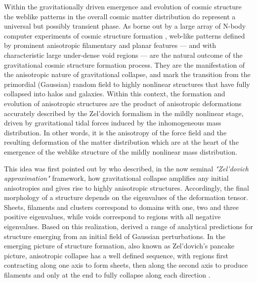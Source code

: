 Within the gravitationally driven emergence and evolution of cosmic structure the weblike patterns in the overall cosmic matter 
distribution do represent a universal but possibly transient phase. As borne out by a large array of N-body computer experiments 
of cosmic structure formation \citep[e.g.][]{Springel2005c, Vogelsberger2014,Schaye2015}, web-like patterns 
defined by prominent anisotropic filamentary and planar features --- and with characteristic large under-dense void regions --- are the 
natural outcome of the gravitational cosmic structure formation process. They are the manifestation of the anisotropic nature of gravitational 
collapse, and mark the transition from the primordial (Gaussian) random field to highly nonlinear structures that have fully collapsed into halos 
and galaxies. 
Within this context, the formation and evolution of anisotropic structures are the product of anisotropic deformations accurately described by the Zel'dovich formalism in the mildly nonlinear stage, driven by gravitational tidal forces induced by the inhomogeneous mass distribution.
%
 In other words, it is the anisotropy of the force field and the resulting deformation of 
the matter distribution which are at the heart of the emergence of the weblike structure of the mildly nonlinear mass distribution.

This idea was first pointed out by \citet[][also see \citealt{Shandarin1989}]{Zeldovich1970} who described, in the now seminal \emph{"Zel'dovich approximation"} framework, how gravitational collapse amplifies any initial anisotropies and gives rise to 
highly anisotropic structures. Accordingly, the final morphology of a structure depends on 
the eigenvalues of the deformation tensor.  Sheets, filaments and clusters correspond to domains with one, two and three positive 
eigenvalues, while voids correspond to regions with all negative eigenvalues. Based on this realization, \cite{Doroshkevich1970} derived 
a range of analytical predictions for structure emerging from an initial field of Gaussian perturbations. In the emerging picture of 
structure formation, also known as Zel'dovich's pancake picture, anisotropic collapse has a well defined sequence, with regions first 
contracting along one axis to form sheets, then along the second axis to produce filaments and only at the end to fully collapse along 
each direction \citep{Shandarin1989,Shandarin2009}. 

